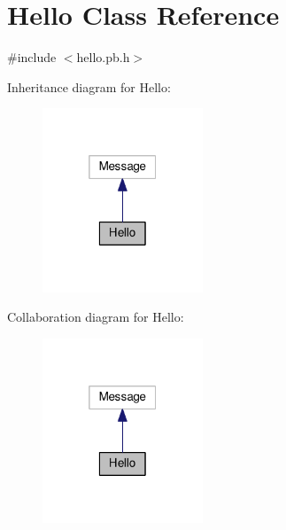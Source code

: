 \hypertarget{class_hello}{}\section{Hello Class Reference}
\label{class_hello}


{\ttfamily \#include $<$hello.\+pb.\+h$>$}



Inheritance diagram for Hello\+:
\nopagebreak
\begin{figure}[H]
\begin{center}
\leavevmode
\includegraphics[width=136pt]{class_hello__inherit__graph}
\end{center}
\end{figure}


Collaboration diagram for Hello\+:
\nopagebreak
\begin{figure}[H]
\begin{center}
\leavevmode
\includegraphics[width=136pt]{class_hello__coll__graph}
\end{center}
\end{figure}

